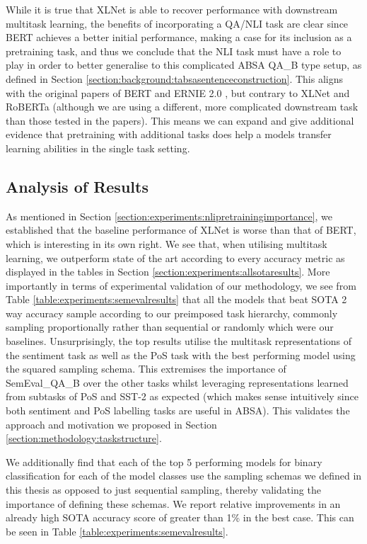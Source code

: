 While it is true that XLNet is able to recover performance with downstream multitask learning, the benefits of incorporating a QA/NLI task are clear since BERT achieves a better initial performance, making a case for its inclusion as a pretraining task, and thus we conclude that the NLI task must have a role to play in order to better generalise to this complicated ABSA QA\_B type setup, as defined in Section \ref{section:background:tabsasentenceconstruction}. This aligns with the original papers of BERT and ERNIE 2.0 \cite{Devlin2018, Sun2019a}, but contrary to XLNet and RoBERTa \cite{Yang2019, Liu2019} (although we are using a different, more complicated downstream task than those tested in the papers). This means we can expand and give additional evidence that pretraining with additional tasks does help a models transfer learning abilities in the single task setting.

\subsection{Analysis of Results}
As mentioned in Section \ref{section:experiments:nlipretrainingimportance}, we established that the baseline performance of XLNet is worse than that of BERT, which is interesting in its own right. We see that, when utilising multitask learning, we outperform state of the art according to every accuracy metric as displayed in the tables in Section \ref{section:experiments:allsotaresults}. More importantly in terms of experimental validation of our methodology, we see from Table \ref{table:experiments:semevalresults} that all the models that beat SOTA 2 way accuracy sample according to our preimposed task hierarchy, commonly sampling proportionally rather than sequential or randomly which were our baselines. Unsurprisingly, the top results utilise the multitask representations of the sentiment task as well as the PoS task with the best performing model using the squared sampling schema. This extremises the importance of SemEval\_QA\_B over the other tasks whilst leveraging representations learned from subtasks of PoS and SST-2 as expected (which makes sense intuitively since both sentiment and PoS labelling tasks are useful in ABSA). This validates the approach and motivation we proposed in Section \ref{section:methodology:taskstructure}.

We additionally find that each of the top 5 performing models for binary classification for each of the model classes use the sampling schemas we defined in this thesis as opposed to just sequential sampling, thereby validating the importance of defining these schemas. We report relative improvements in an already high SOTA accuracy score of greater than 1\% in the best case. This can be seen in Table \ref{table:experiments:semevalresults}.

